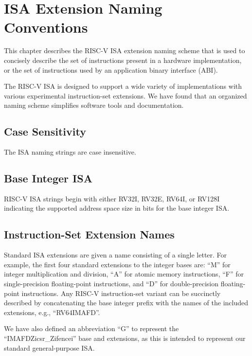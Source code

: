 \chapter{ISA Extension Naming Conventions}
\label{naming}

This chapter describes the RISC-V ISA extension naming scheme that is
used to concisely describe the set of instructions present in a
hardware implementation, or the set of instructions used by an
application binary interface (ABI).

\begin{commentary}
The RISC-V ISA is designed to support a wide variety of
implementations with various experimental instruction-set extensions.
We have found that an organized naming scheme simplifies software
tools and documentation.
\end{commentary}

\section{Case Sensitivity}

The ISA naming strings are case insensitive.

\section{Base Integer ISA}
RISC-V ISA strings begin with either RV32I, RV32E, RV64I, or RV128I
indicating the supported address space size in bits for the base
integer ISA.

\section{Instruction-Set Extension Names}

Standard ISA extensions are given a name consisting of a single
letter.  For example, the first four standard
extensions to the integer bases are:
``M'' for integer multiplication and division,
``A'' for atomic memory instructions,
``F'' for single-precision floating-point instructions, and
``D'' for double-precision floating-point instructions.
Any RISC-V instruction-set variant can be succinctly described by
concatenating the base integer prefix with the names of the included
extensions, e.g., ``RV64IMAFD''.

We have also defined an abbreviation ``G'' to represent the ``IMAFDZicsr\_Zifencei''
base and extensions, as this is intended to represent our standard
general-purpose ISA.

